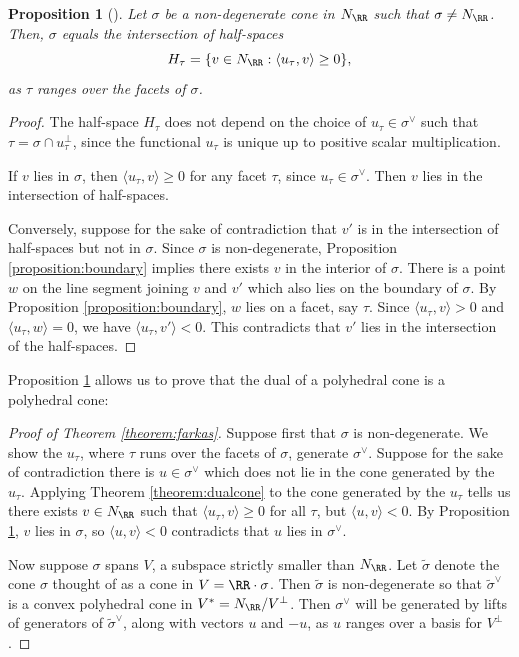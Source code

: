 \documentclass[12pt]{amsart}
\theoremstyle{plain}
\newtheorem{proposition}[theorem]{Proposition}
\begin{document}
\begin{proposition}[{\cite[\S 1.2]{Fulton93}}]\label{proposition:dualdescription}
Let $\sigma$ be a non-degenerate cone in $N_\RR$ such that $\sigma \ne N_\RR$.
Then, $\sigma$ equals the intersection of half-spaces
$$H_\tau = \{v \in N_\RR : \langle u_\tau, v\rangle \ge 0\},$$
as $\tau$ ranges over the facets of $\sigma$.
\end{proposition}
\begin{proof}
The half-space $H_\tau$ does not depend on the choice of $u_\tau \in \sigma^\vee$ such that $\tau = \sigma \cap u_\tau^\perp$, since the functional $u_\tau$ is unique up to positive scalar multiplication.

If $v$ lies in $\sigma$, then $\langle u_\tau, v \rangle \ge 0$ for any facet $\tau$, since $u_\tau \in \sigma^\vee$.
Then $v$ lies in the intersection of half-spaces.

Conversely, suppose for the sake of contradiction that $v'$ is in the intersection of half-spaces but not in $\sigma$.
Since $\sigma$ is non-degenerate, Proposition \ref{proposition:boundary} implies there exists $v$ in the interior of $\sigma$.
There is a point $w$ on the line segment joining $v$ and $v'$ which also lies on the boundary of $\sigma$.
By Proposition \ref{proposition:boundary}, $w$ lies on a facet, say $\tau$.
Since $\langle u_\tau, v \rangle > 0$ and $\langle u_\tau, w \rangle = 0$, we have $\langle u_\tau, v' \rangle < 0$.
This contradicts that $v'$ lies in the intersection of the half-spaces.
\end{proof}

Proposition \ref{proposition:dualdescription} allows us to prove that the dual of a polyhedral cone is a polyhedral cone:

\begin{proof}[Proof of Theorem \ref{theorem:farkas}]
Suppose first that $\sigma$ is non-degenerate.
We show the $u_\tau$, where $\tau$ runs over the facets of $\sigma$, generate $\sigma^\vee$.
Suppose for the sake of contradiction there is $u \in \sigma^\vee$ which does not lie in the cone generated by the $u_\tau$.
Applying Theorem \ref{theorem:dualcone} to the cone generated by the $u_\tau$ tells us there exists $v \in N_\RR$ such that $\langle u_\tau, v\rangle \ge 0$ for all $\tau$, but $\langle u, v \rangle < 0$.
By Proposition \ref{proposition:dualdescription}, $v$ lies in $\sigma$, so $\langle u, v \rangle < 0$ contradicts that $u$ lies in $\sigma^\vee$.

Now suppose $\sigma$ spans $V$, a subspace strictly smaller than $N_\RR$.
Let $\tilde \sigma$ denote the cone $\sigma$ thought of as a cone in $V = \RR \cdot \sigma$.
Then $\tilde \sigma$ is non-degenerate so that $\tilde \sigma^\vee$ is a convex polyhedral cone in $V^* = N_\RR / V^\perp$.
Then $\sigma^\vee$ will be generated by lifts of generators of $\tilde \sigma^\vee$, along with vectors $u$ and $-u$, as $u$ ranges over a basis for $V^\perp$.
\end{proof}
\end{document}
